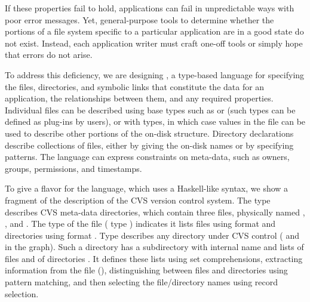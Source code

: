 \documentclass[nocopyrightspace,10pt]{sigplanconf}
\begin{document}
If these properties fail to hold, applications can fail in
unpredictable ways with poor error messages.  Yet, general-purpose
tools to determine whether the portions of a file system specific to a
particular application are in a good state do not exist.  Instead, each
application writer must craft one-off tools or simply hope that errors
do not arise. 

To address this deficiency, we are designing \dirpads{}, a type-based
language 
for specifying the files, directories, and symbolic links that
constitute the data for an application, the relationships between
them, and any required properties.  Individual files can be described
using base types such as  or  (such types can be
defined as plug-ins by users), or with \pads{}\cite{fisher+:pads}
types, in which case values in the file can be used to describe other
portions of the on-disk structure.  Directory declarations describe
collections of files, either by giving the on-disk names or by
specifying patterns.   The language
can express constraints on meta-data, such as
owners, groups, permissions, and timestamps.  

To give a flavor for the language, which uses a Haskell-like syntax,
we show a fragment of the 
description of the CVS version control system.  The type
 describes CVS meta-data directories, which contain three files, physically named
, , and . 
The type of the  file (\pads{} type ) indicates it
lists files using format 
and directories using format .
Type  describes any 
directory under CVS control ( and  in the
graph).  Such a directory has a subdirectory with 
internal name  and 
lists of files  and   
of directories .
It defines these lists using set comprehensions,
extracting information from the 
file (), distinguishing between 
files and directories using pattern matching, and then selecting the
file/directory names using record selection.
\end{document}

